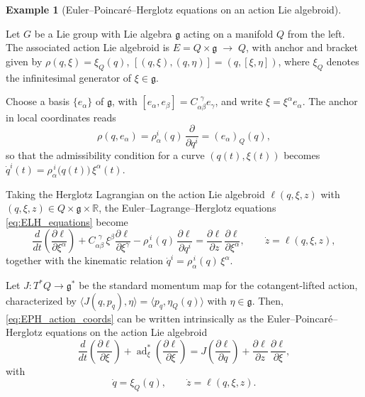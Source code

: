 \documentclass[11pt,a4paper]{article}
\theoremstyle{definition}
\newtheorem{example}[theorem]{Example}
\begin{document}
\begin{example}[Euler--Poincar\'e--Herglotz equations on an action Lie algebroid]\label{ex:EPH_action_intrinsic}

Let $G$ be a Lie group with Lie algebra $\mathfrak{g}$ acting on a manifold
$Q$ from the left. The associated action Lie algebroid is $E = Q \times \mathfrak{g} \;\to\; Q$, with anchor and bracket given by $\rho(q,\xi) = \xi_Q(q)$, $[(q,\xi),(q,\eta)] = (q,[\xi,\eta])$, where $\xi_Q$ denotes the infinitesimal generator of $\xi\in\mathfrak{g}$.

Choose a basis $\{e_\alpha\}$ of $\mathfrak{g}$, with
$[e_\alpha,e_\beta]=C_{\alpha\beta}^{\ \ \gamma}e_\gamma$, and write
$\xi = \xi^\alpha e_\alpha$. The anchor in local coordinates reads
\[
\rho(q,e_\alpha) = \rho_\alpha^i(q)\,\frac{\partial}{\partial q^i}
= (e_\alpha)_Q(q),
\]
so that the admissibility condition for a curve $(q(t),\xi(t))$ becomes $\dot q^i(t) = \rho_\alpha^{\,i}\big(q(t)\big)\,\xi^\alpha(t)$.


Taking the Herglotz Lagrangian on the action Lie algebroid $\ell(q,\xi,z)$ with $(q,\xi,z)\in Q\times\mathfrak{g}\times\mathbb{R}$, the Euler--Lagrange--Herglotz equations
\eqref{eq:ELH_equations} become
\begin{equation}\label{eq:EPH_action_coords}
\frac{d}{dt}\!\left(\frac{\partial \ell}{\partial \xi^\alpha}\right)
+ C_{\alpha\beta}^{\ \ \gamma}\,\xi^\beta 
   \frac{\partial \ell}{\partial \xi^\gamma}
- \rho_\alpha^{\,i}(q)\,\frac{\partial \ell}{\partial q^i}
=
\frac{\partial \ell}{\partial z}\,
   \frac{\partial \ell}{\partial \xi^\alpha},
\qquad
\dot z = \ell(q,\xi,z),
\end{equation}
together with the kinematic relation $\dot q^i = \rho_\alpha^{\,i}(q)\,\xi^\alpha$.


Let $J\colon T^*Q\to\mathfrak{g}^*$ be the standard momentum map for the
cotangent-lifted action, characterized by
$\big\langle J(q,p_q),\eta\big\rangle 
= \big\langle p_q,\eta_Q(q)\big\rangle$ with $\eta\in\mathfrak{g}$. Then, \eqref{eq:EPH_action_coords} can be written intrinsically as the
Euler--Poincar\'e--Herglotz equations on the action Lie algebroid
\begin{equation}\label{eq:EPH_action_intrinsic}
\frac{d}{dt}\left(\frac{\partial \ell}{\partial \xi}\right)
+ \operatorname{ad}^*_{\xi}\!\left(\frac{\partial \ell}{\partial \xi}\right)
= J\!\left(\frac{\partial \ell}{\partial q}\right)
+ \frac{\partial \ell}{\partial z}\,\frac{\partial \ell}{\partial \xi},
\end{equation}
with
\[
\dot q = \xi_Q(q), \qquad \dot z = \ell(q,\xi,z).
\]
\end{example}
\end{document}
